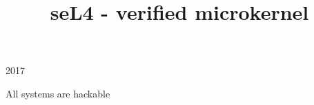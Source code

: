 

\title{seL4 - verified microkernel}


\begin{frame}{}
\titlepage
\end{frame}

\begin{frame}
  \frametitle{}
  \begin{center}
    {\LARGE 2017}
  \end{center}

  \vspace{5mm}
    
  \begin{center}
    {\Large All systems are hackable}
  \end{center}
\end{frame}

